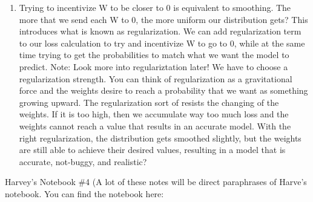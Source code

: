 \documentclass[a4paper, 11pt, oneside]{researchjournal} %
\begin{document}
\begin{enumerate}
    \item Trying to incentivize W to be closer to 0 is equivalent to smoothing. The more that we send each W to 0, the more uniform our distribution gets? This introduces what is known as regularization. We can add regularization term to our loss calculation to try and incentivize W to go to 0, while at the same time trying to get the probabilities to match what we want the model to predict. Note: Look more into regulariztation later! We have to choose a regularization strength. You can think of regularization as a gravitational force and the weights desire to reach a probability that we want as something growing upward. The regularization sort of resists the changing of the weights. If it is too high, then we accumulate way too much loss and the weights cannot reach a value that results in an accurate model. With the right regularization, the distribution gets smoothed slightly, but the weights are still able to achieve their desired values, resulting in a model that is accurate, not-buggy, and realistic?
\end{enumerate}


Harvey's Notebook \#4 (A lot of these notes will be direct paraphrases of Harve's notebook. You can find the notebook here: \cite{HarveyDamTREUGit}
\end{document}
